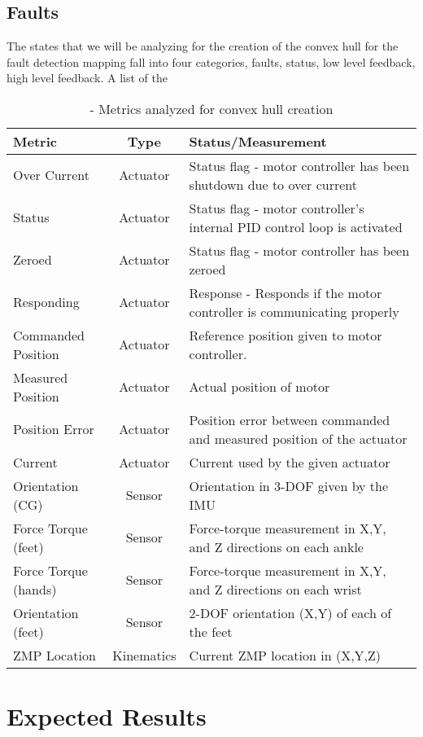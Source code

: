 \subsection{Faults}\label{sec:faults}
The states that we will be analyzing for the creation of the convex hull 
for the fault detection mapping fall into four categories, faults, status, 
low level feedback, high level feedback.  A list of the 

\begin{table*}[t]
\caption{-  Metrics analyzed for convex hull creation}\label{table:states}
\begin{center}
\begin{tabular}{|l|c|l|}\hline
 Metric   &   Type   &   Status/Measurement \\\hline\hline


 Over Current 								& Actuator 							& Status flag - motor controller has been shutdown due to over current				\\\hline
 Status												& Actuator							&	Status flag - motor controller's internal PID control loop is activated 		\\\hline
 Zeroed 											& Actuator							& Status flag - motor controller has been zeroed			 												\\\hline
 Responding 									&	Actuator							&	Response - Responds if the motor controller is communicating properly 			\\\hline
 Commanded Position 					&	Actuator							& Reference position given to motor controller.																\\\hline
 Measured Position 						& Actuator							& Actual position of motor 																										\\\hline
 Position Error								& Actuator							& Position error between commanded and measured position of the actuator			\\\hline
 Current											& Actuator							& Current used by the given actuator 																					\\\hline
 Orientation (CG)							& Sensor								& Orientation in 3-DOF given by the IMU																				\\\hline
 Force Torque (feet)					& Sensor								& Force-torque measurement in X,Y, and Z directions on each ankle							\\\hline
 Force Torque (hands)					& Sensor								& Force-torque measurement in X,Y, and Z directions on each wrist							\\\hline
 Orientation (feet)						& Sensor								& 2-DOF orientation (X,Y) of each of the feet 																\\\hline
 ZMP Location									& Kinematics						& Current ZMP location in (X,Y,Z)																							\\\hline
\end{tabular}
\end{center} 
\end{table*}



\section{Expected Results}\label{sec:expResults}
